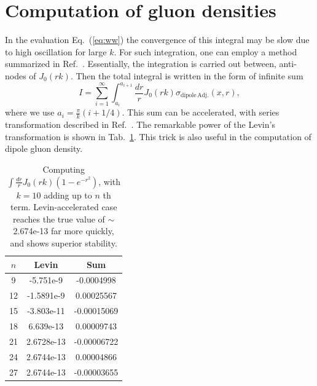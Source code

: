 \documentclass[11pt]{article}
\numberwithin{equation}{section}
\numberwithin{table}{section}
\numberwithin{figure}{section}
\newcommand{\sdpa}[0]{\sigma_{\mathrm{dipole\,Adj.}}}
\begin{document}
\appendix	
\section{Computation of gluon densities}
In the evaluation Eq.~(\ref{eq:ww}) the convergence of this integral may be slow due to high oscillation for large $k$.
For such integration, one can employ a method summarized in Ref.~\cite{LYNESS1985109}. 
Essentially, the integration is carried out between, anti-nodes of $J_0(rk)$. Then the total integral is written in the form of infinite sum
\begin{equation}
	I=\sum^\infty_{i=1} \int^{a_{i+1}}_{a_i} \frac{dr}{r}J_0(r k) \sdpa(x,r),
\end{equation}
where we use $a_{i}=\frac{\pi}{k}(i+1/4)$.
This sum can be accelerated, with series transformation described in Ref.~\cite{doi:10.1080/00207167308803075,Weniger:1989rea,HOMEIER19951}.
The remarkable power of the Levin's transformation is shown in Tab.~\ref{tab:levin}.
This trick is also useful in the computation of dipole gluon density. 

\begin{table}
	\begin{center}
		\begin{tabular}{|c||c|c|}
			\hline
			$n$&Levin&Sum\\\hline
			9&	-5.751e-9&	-0.0004998\\\hline
			12&	-1.5891e-9&	0.00025567\\\hline
			15&	-3.803e-11&	-0.00015069\\\hline
			18&	6.639e-13&	0.00009743\\\hline
			21&	2.6728e-13&	-0.00006722\\\hline
			24&	2.6744e-13&	0.00004866\\\hline
			27&	2.6744e-13&	-0.00003655\\\hline
		\end{tabular}
	\end{center}
	\caption{
		Computing $\int \frac{dr}{r}J_0(r k)(1-e^{-r^2})$, with $k=10$ adding up to $n$ th term.
		Levin-accelerated case reaches the true value of $\sim$2.674e-13 far more quickly, and shows superior stability.
	}
	\label{tab:levin}
 \end{table}
\end{document}
